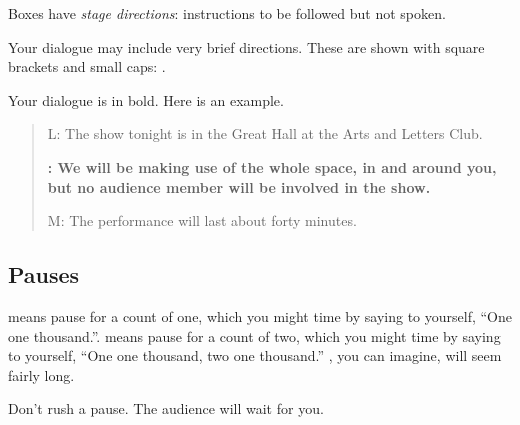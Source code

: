 Boxes have \textit{stage directions}: instructions to be followed but not spoken.

  \setlength{\fboxrule}{2pt}%
  \vspace{0.3\baselineskip}%
  \setlength{\fboxrule}{1pt}%
  \vspace{0.3\baselineskip}


\vspace{0.5\baselineskip}
\vspace{0.5\baselineskip}



Your dialogue may include very brief directions.  These are shown with square brackets and small caps: .

Your dialogue is in bold.  Here is an example.

\begin{quote}

L:  The show tonight is in the Great Hall at the Arts and Letters Club.

\textbf{\performerletter{\speaker}:   We will be making use of the whole space, in and around you, but no audience member will be involved in the show.}

M:  The performance will last about forty minutes.

\end{quote}

\subsection*{Pauses}

 means pause for a count of one, which you might time by saying to yourself, ``One one thousand.''.   means pause for a count of two, which you might time by saying to yourself, ``One one thousand, two one thousand.''  , you can imagine, will seem fairly long.

Don't rush a pause.  The audience will wait for you.

